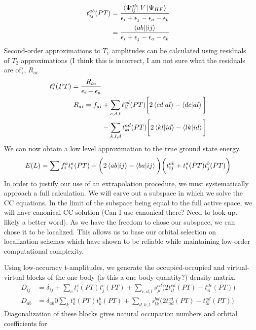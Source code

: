 \documentclass[letterpaper, 12pt]{article}
\begin{document}
\begin{align*}
t^{ab}_{ij}(PT) &= 
\frac{
	\bra{\Psi^{ab}_{ij}} V \ket{\Psi_{HF}}}
	{\epsilon_i + \epsilon_j - \epsilon_a - \epsilon_b}	\\
&= \frac{
	\braket{ab||ij}}
	{\epsilon_i + \epsilon_j - \epsilon_a - \epsilon_b}	
\end{align*}
Second-order approximations to $T_1$ amplitudes can be calculated using residuals of $T_2$ approximations (I think this is incorrect, I am not sure what the residuals are of), $R_{ai}$
\begin{align*}
&&t_i^a(PT)= \frac{R_{ai}}{\epsilon_i - \epsilon_a}\\
&&R_{ai} =f_{ai} &+ \sum_{c,d,l} t_{il}^{cd}(PT) \bigg[2 \braket{cd|al} - \braket{dc|al} \bigg] \\ &&& - \sum_{k,l,d} t_{kl}^{ad}(PT) \bigg[2 \braket{kl|id} - \braket{lk|id} \bigg]
\end{align*} 
We can now obtain a low level approximation to the true ground state energy.
\begin{align*}
E(L) = \sum f^a_{i} t_i^a(PT) + \bigg(2 \braket{ab|ij} - \braket{ba|ij}\bigg)\bigg(t^{ab}_{ij} +   t_i^a(PT)  t_j^b(PT)\bigg)
\end{align*}
In order to justify our use of an extrapolation procedure, we must systematically approach a full calculation. We will carve out a subspace in which we solve the CC equations. In the limit of the subspace being equal to the full active space, we will have canonical CC solution (Can I use canonical there? Need to look up. likely a better word). As we have the freedom to chose our subspace, we can chose it to be localized. This allows us to base our orbital selection on localization schemes which have shown to be reliable while maintaining low-order  computational complexity.

Using low-accuracy t-amplitudes, we generate the occupied-occupied and virtual-virtual blocks of the one body (is this a one body quantity?) density matrix.
\begin{align*}
D_{ij} &= \delta_{ij} + \sum_c t_i^c(PT) t_j^c(PT) + \sum_{c,d,l} s_{jl}^{cd}\bigg(2 t_{il}^{cd}(PT) - t_{il}^{dc}(PT)\bigg)\\
D_{ab} &= \delta_{ab} 0 \sum_k t_k^a(PT) t_k^b(PT) + \sum_{d,k,l} s_{lk}^{bd}\bigg(2 t_{ad}^{cd}(PT) - t_{lk}^{ad}(PT)\bigg)
\end{align*}
Diagonalization of these blocks gives natural occupation numbers and orbital coefficients for  
\end{document}
